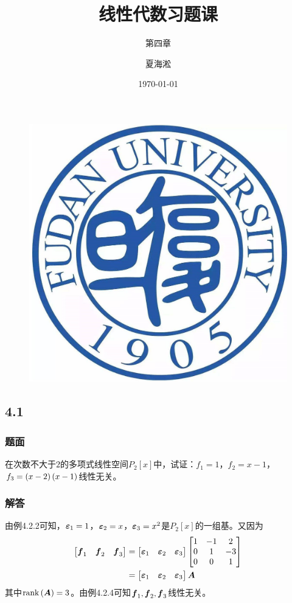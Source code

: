 \documentclass{beamer}
\author{夏海淞}
\title{线性代数习题课}
\subtitle{第四章}
\date{\today}
\begin{document}
\setlength{\parskip}{0.45\baselineskip}

\begin{frame}
    \titlepage
    \begin{figure}[htpb]
        \begin{center}
            \vspace*{-0.5cm}
            \includegraphics[width=0.1\linewidth]{../pic/FDU.jpeg}
        \end{center}
    \end{figure}
\end{frame}

\subsection*{4.1}
\begin{frame}
    \frametitle{题面}
    在次数不大于\(2\)的多项式线性空间\(P_2[x]\)中，试证：\(f_1=1\)，\(f_2=x-1\)，\(f_3=\left( x-2 \right)\left( x-1 \right)\)线性无关。
\end{frame}

\begin{frame}
    \frametitle{解答}
    由例4.2.2可知，\(\boldsymbol{\varepsilon}_1=1\)，\(\boldsymbol{\varepsilon}_2=x\)，\(\boldsymbol{\varepsilon}_3=x^2\)是\(P_2[x]\)的一组基。又因为
    \begin{align*}
        \begin{bmatrix}
            \boldsymbol{f}_1 & \boldsymbol{f}_2 & \boldsymbol{f}_3
        \end{bmatrix}
         & =
        \begin{bmatrix}
            \boldsymbol{\varepsilon}_1 & \boldsymbol{\varepsilon}_2 & \boldsymbol{\varepsilon}_3
        \end{bmatrix}
        \begin{bmatrix}
            1 & -1 & 2  \\
            0 & 1  & -3 \\
            0 & 0  & 1
        \end{bmatrix} \\
         & =
        \begin{bmatrix}
            \boldsymbol{\varepsilon}_1 & \boldsymbol{\varepsilon}_2 & \boldsymbol{\varepsilon}_3
        \end{bmatrix}\boldsymbol{A}
    \end{align*}
    其中\(\mathrm{rank}\left( \boldsymbol{A} \right)=3\)。由例4.2.4可知\(\boldsymbol{f}_1,\boldsymbol{f}_2,\boldsymbol{f}_3\)线性无关。
\end{frame}
\end{document}
